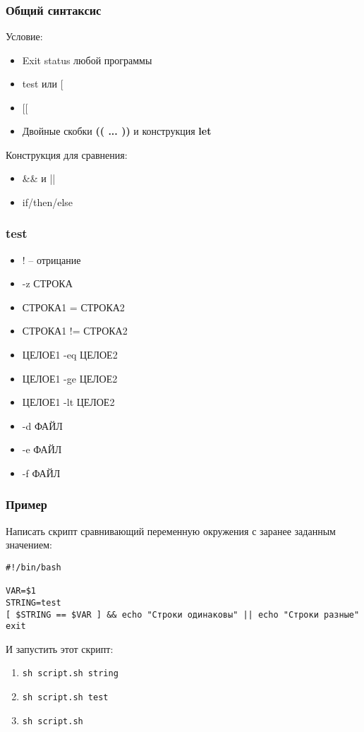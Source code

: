 
\begin{frame}
\frametitle{Общий синтаксис}

	Условие:
	\begin{itemize}
		\item Exit status любой программы
		\item test или $[$ 
                \item $[[$
		\item Двойные скобки {\bf (( ... ))} и конструкция {\bf let}
	\end{itemize}


	Конструкция для сравнения:
	\begin{itemize}
		\item \&\& и ||
		\item if/then/else
	\end{itemize}

\end{frame}


\begin{frame}[fragile]
\frametitle{test}

	\begin{itemize}
	    \item ! -- отрицание
	    \item -z СТРОКА
	    \item СТРОКА1 = СТРОКА2
	    \item СТРОКА1 != СТРОКА2
	    \item ЦЕЛОЕ1 -eq ЦЕЛОЕ2
	    \item ЦЕЛОЕ1 -ge ЦЕЛОЕ2
	    \item ЦЕЛОЕ1 -lt ЦЕЛОЕ2
	    \item -d ФАЙЛ
	    \item -e ФАЙЛ
	    \item -f ФАЙЛ
	\end{itemize}

\end{frame}


\begin{frame}[fragile]
\frametitle{Пример}

	Написать скрипт сравнивающий переменную окружения с заранее заданным значением:
	
	\small\begin{lstlisting}
#!/bin/bash

VAR=$1
STRING=test
[ $STRING == $VAR ] && echo "Строки одинаковы" || echo "Строки разные"
exit
	\end{lstlisting}
    \normalsize
	И запустить этот скрипт:
	
	\begin{enumerate}
		\item {\tt sh script.sh string}
		\item {\tt sh script.sh test}
		\item {\tt sh script.sh}
	\end{enumerate}

\end{frame}

